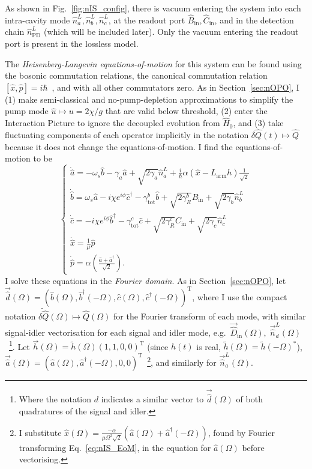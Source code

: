 As shown in Fig.~\ref{fig:nIS_config}, there is vacuum entering the system into each intra-cavity mode $\hat n^L_a, \hat n^L_b, \hat n^L_c$, at the readout port $\hat B_\text{in}, \hat C_\text{in}$, and in the detection chain $\hat n^L_\text{PD}$ (which will be included later). Only the vacuum entering the readout port is present in the lossless model.

The \emph{Heisenberg-Langevin equations-of-motion} for this system can be found using the bosonic commutation relations, the canonical commutation relation $[\hat x,\hat p]=i\hbar$~\cite{}, and with all other commutators zero. As in Section~\ref{sec:nOPO}, I (1) make semi-classical and no-pump-depletion approximations to simplify the pump mode $\hat u\mapsto u=2\chi/g$ that are valid below threshold, (2) enter the Interaction Picture to ignore the decoupled evolution from $\hat H_0$, and (3) take fluctuating components of each operator implicitly in the notation $\delta\hat{Q}(t)\mapsto\hat{Q}$ because it does not change the equations-of-motion. I find the equations-of-motion to be
\begin{equation}\label{eq:nIS_EoM}
\begin{cases}
\dot{\hat{a}}=-\omega_s\hat{b} - \gamma_a \hat{a} + \sqrt{2\gamma_a}\hat{n}^L_a+\frac{i}{\hbar}\alpha(\hat{x}-L_\mathrm{arm}h)\frac{1}{\sqrt{2}}\\
\dot{\hat{b}}=\omega_s\hat{a} - i\chi e^{i\phi}\hat{c}^\dagger - \gamma^b_\mathrm{tot} \hat{b} + \sqrt{2\gamma^b_R}\hat{B}_\mathrm{in} + \sqrt{2\gamma_b}\hat{n}^L_b\\
\dot{\hat{c}}=-i\chi e^{i\phi}\hat{b}^\dagger - \gamma^c_\mathrm{tot} \hat{c} + \sqrt{2\gamma^c_R}\hat{C}_\mathrm{in} + \sqrt{2\gamma_c}\hat{n}^L_c\\
\dot{\hat{x}}=\frac{1}{\mu}\hat{p}\\
\dot{\hat{p}}=\alpha\left(\frac{\hat{a}+\hat{a}^\dag}{\sqrt{2}}\right).
\end{cases}
\end{equation}
I solve these equations in the \emph{Fourier domain}. As in Section~\ref{sec:nOPO}, let $\vec{\hat d}(\Omega)=(\hat b(\Omega), \hat b^\dag(-\Omega), \hat c(\Omega), \hat c^\dag(-\Omega))^\text{T}$, where I use the compact notation $\tilde{\delta\hat{Q}}(\Omega)\mapsto\hat{Q}(\Omega)$ for the Fourier transform of each mode, with similar signal-idler vectorisation for each signal and idler mode, e.g.\ $\vec{\hat{D}}_\text{in}(\Omega),\; \vec{\hat n}^L_d(\Omega)$~\footnote{Where the notation $d$ indicates a similar vector to $\vec{\hat d}(\Omega)$ of both quadratures of the signal and idler.}. Let $\vec h(\Omega)=\tilde h(\Omega) (1,1,0,0)^\text{T}$ (since $h(t)$ is real, $\tilde h(\Omega)=\tilde h(-\Omega)^*$), $\vec{\hat a}(\Omega)=(\hat a(\Omega), \hat a^\dag(-\Omega),0,0)^\text{T}$~\footnote{I substitute $\hat x(\Omega) = \frac{-\alpha}{\mu\Omega^2\sqrt2}\left(\hat{a}(\Omega)+\hat{a}^\dag(-\Omega)\right)$, found by Fourier transforming Eq.~\ref{eq:nIS_EoM}, in the equation for $\hat a(\Omega)$ before vectorising.}, and similarly for $\vec{\hat n}^L_a(\Omega)$.
